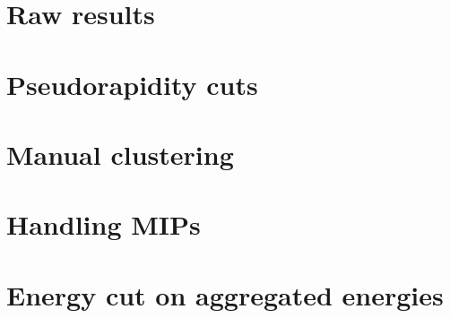 \begin{comment}
\subsubsection{Polar-angle-dependent Energy Cuts on EMCs for Pions}
\subsection{Simulation Parameters}
\subsection{Results}

\end{comment}




\section{Raw results}







\section{Pseudorapidity cuts}

\section{Manual clustering}

\section{Handling MIPs}

\section{Energy cut on aggregated energies}